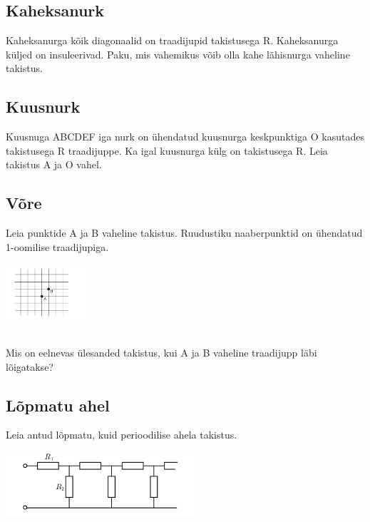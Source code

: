 \documentclass{article}
\begin{document}
\subsection{Kaheksanurk}
Kaheksanurga kõik diagonaalid on traadijupid takistusega R. Kaheksanurga küljed on insuleerivad. Paku, mis vahemikus võib olla kahe lähisnurga vaheline takistus.
\subsection{Kuusnurk}
Kuusnuga ABCDEF iga nurk on ühendatud kuusnurga keskpunktiga O kasutades takistusega R traadijuppe. Ka igal kuusnurga külg on takistusega R. Leia takistus A ja O vahel.
\subsection{Võre}
Leia punktide A ja B vaheline takistus. Ruudustiku naaberpunktid on ühendatud 1-oomilise traadijupiga.
\begin{center}
\includegraphics[width =  3cm]{ec11.png}
\end{center}
\subsection{}
Mis on eelnevas ülesanded takistus, kui A ja B vaheline traadijupp läbi lõigatakse?
\subsection{Lõpmatu ahel}
Leia antud lõpmatu, kuid perioodilise ahela takistus.
\begin{center}
\includegraphics[width =  7cm]{ec14.PNG}
\end{center}
\end{document}
